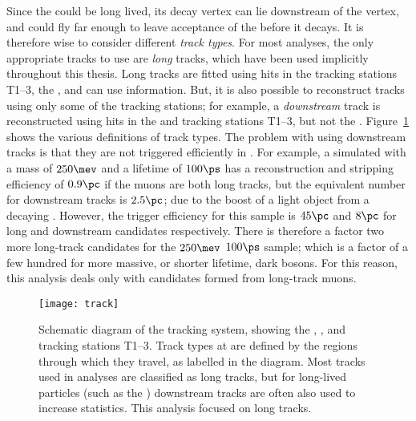 Since the \db could be long lived, its decay vertex can lie downstream of the \Bd vertex, and could
fly far enough to leave acceptance of the \velo before it decays.
It is therefore wise to consider different \emph{track types}.
For most \lhcb analyses, the only appropriate tracks to use are \emph{long} tracks, which
have been used implicitly throughout this thesis.
Long tracks are fitted using hits in the tracking stations T1--3, the \velo, and can use \ttracker
information.
But, it is also possible to reconstruct tracks using only some of the tracking stations; for
example, a \emph{downstream} track is reconstructed using hits in the \ttracker and tracking
stations T1--3, but not the \velo.
Figure~\ref{fig:db:lldd} shows the various definitions of track types.
The problem with using downstream tracks is that they are not triggered efficiently in \hlttwo.
For example, a simulated \db with a mass of $250\mev$ and a lifetime of $100\ps$ has a
reconstruction and
stripping efficiency of \approx$0.9\pc$ if the muons are both long tracks, but the equivalent
number for downstream tracks is \approx$2.5\pc$; due to the boost of a light object from a decaying
\Bd.
However, the trigger efficiency for this sample is \approx$45\pc$ and $8\pc$ for long and
downstream candidates respectively.
There is therefore a factor two more long-track candidates for the $250\mev$ $100\ps$ sample; which
is a factor of a few hundred for more massive, or shorter lifetime, dark bosons.
For this reason, this analysis deals only with \db candidates formed from long-track muons.

\begin{figure}
  \begin{center}
    \texttt{[image: track]}
    \caption[Track definitions in the LHCb detector]
    {
      Schematic diagram of the \lhcb tracking system, showing the \velo, \ttracker, and tracking
      stations T1--3.
      Track types at \lhcb are defined by the regions through which they travel, as labelled in the
      diagram.
      Most tracks used in analyses are classified as long tracks, but for long-lived particles
      (such as the \KS) downstream tracks are often also used to increase statistics.
      This analysis focused on long tracks.
    }
    \label{fig:db:lldd}
  \end{center}
\end{figure}




